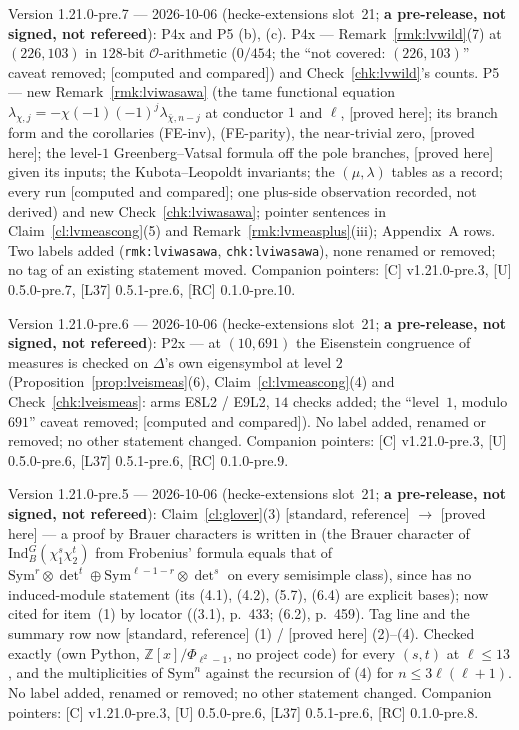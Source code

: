 \documentclass[11pt]{article}
\theoremstyle{remark}
\newcommand{\Z}{\mathbb{Z}}
\newcommand{\Sym}{\mathrm{Sym}}
\newcommand{\PROVED}{\textsf{[proved here]}}
\newcommand{\STD}{\textsf{[standard, reference]}}
\newcommand{\CMPD}{\textsf{[computed and compared]}}   %
\begin{document}
Version 1.21.0-pre.7 --- 2026-10-06 (hecke-extensions slot~21; \textbf{a pre-release, not signed, not refereed}): P4x and P5 (b), (c).
P4x --- Remark~\ref{rmk:lvwild}(7) at $(226,103)$ in $128$-bit $\mathcal O$-arithmetic ($0/454$; the ``not covered: $(226,103)$'' caveat removed; \CMPD) and Check~\ref{chk:lvwild}'s counts.
P5 --- new Remark~\ref{rmk:lviwasawa} (the tame functional equation $\lambda_{\chi,j}=-\chi(-1)(-1)^{j}\lambda_{\bar\chi,n-j}$ at conductor $1$ and $\ell$, \PROVED; its branch form and the
corollaries (FE-inv), (FE-parity), the near-trivial zero, \PROVED; the level-$1$ Greenberg--Vatsal formula off the pole branches, \PROVED{} given its inputs; the Kubota--Leopoldt invariants; the
$(\mu,\lambda)$ tables as a record; every run \CMPD; one plus-side observation recorded, not derived) and new Check~\ref{chk:lviwasawa}; pointer sentences in Claim~\ref{cl:lvmeascong}(5) and
Remark~\ref{rmk:lvmeasplus}(iii); Appendix~A rows. Two labels added (\texttt{rmk:lviwasawa}, \texttt{chk:lviwasawa}), none renamed or removed; no tag of an existing statement moved.
Companion pointers: [C] v1.21.0-pre.3, [U] 0.5.0-pre.7, [L37] 0.5.1-pre.6, [RC] 0.1.0-pre.10.

Version 1.21.0-pre.6 --- 2026-10-06 (hecke-extensions slot~21; \textbf{a pre-release, not signed, not refereed}): P2x --- at $(10,691)$ the Eisenstein congruence of measures is checked on $\Delta$'s own eigensymbol at level $2$
(Proposition~\ref{prop:lveismeas}(6), Claim~\ref{cl:lvmeascong}(4) and Check~\ref{chk:lveismeas}: arms E8L2 / E9L2, $14$ checks added; the ``level~$1$, modulo $691$'' caveat removed; \CMPD). No label added, renamed or removed; no other statement changed.
Companion pointers: [C] v1.21.0-pre.3, [U] 0.5.0-pre.6, [L37] 0.5.1-pre.6, [RC] 0.1.0-pre.9.

Version 1.21.0-pre.5 --- 2026-10-06 (hecke-extensions slot~21; \textbf{a pre-release, not signed, not refereed}): Claim~\ref{cl:glover}(3) \STD{} $\to$ \PROVED{} --- a
proof by Brauer characters is written in (the Brauer character of $\mathrm{Ind}_B^G(\chi_1^{s}\chi_2^{t})$ from Frobenius' formula equals that of
$\Sym^{r}\otimes\det^{t}\oplus\Sym^{\ell-1-r}\otimes\det^{s}$ on every semisimple class), since \cite{glover} has no induced-module statement (its (4.1), (4.2), (5.7), (6.4) are explicit
bases); \cite{glover} now cited for item~(1) by locator ((3.1), p.~433; (6.2), p.~459). Tag line and the summary row now \STD{} (1) / \PROVED{} (2)--(4). Checked exactly (own Python,
$\Z[x]/\Phi_{\ell^2-1}$, no project code) for every $(s,t)$ at $\ell\le13$, and the multiplicities of $\Sym^{n}$ against the recursion of (4) for $n\le3\ell(\ell+1)$.
No label added, renamed or removed; no other statement changed. Companion pointers: [C] v1.21.0-pre.3, [U] 0.5.0-pre.6, [L37] 0.5.1-pre.6, [RC] 0.1.0-pre.8.
\end{document}
